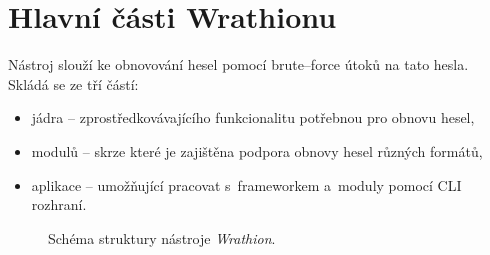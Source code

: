 \section{Hlavní části Wrathionu}
Nástroj slouží ke obnovování hesel pomocí brute--force útoků na tato hesla. Skládá se ze tří
částí:
\begin{itemize}
	\item jádra -- zprostředkovávajícího funkcionalitu potřebnou pro obnovu hesel,
	\item modulů -- skrze které je zajištěna podpora obnovy hesel různých formátů,
	\item aplikace -- umožňující pracovat s~frameworkem a~moduly pomocí CLI rozhraní.
\end{itemize}
\begin{figure}[ht]
    \begin{center}
    \end{center}
    \caption{Schéma struktury nástroje {\it Wrathion}. \cite{Hranicky}}
    \label{memory}
\end{figure}

